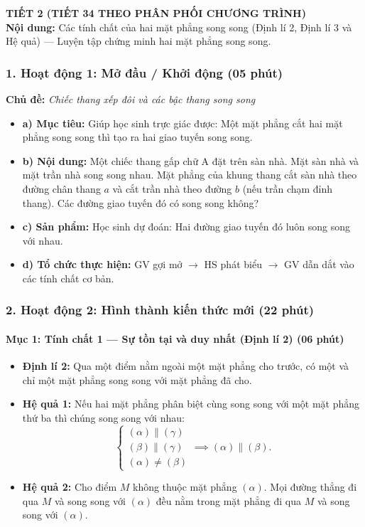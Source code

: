 \documentclass[12pt, a4paper]{article}
\begin{document}
\newpage

{\large \textbf{TIẾT 2 (TIẾT 34 THEO PHÂN PHỐI CHƯƠNG TRÌNH)}}\\[0.3em]
\textbf{Nội dung:} Các tính chất của hai mặt phẳng song song (Định lí 2, Định lí 3 và Hệ quả) --- Luyện tập chứng minh hai mặt phẳng song song.

\subsubsection*{1. Hoạt động 1: Mở đầu / Khởi động (05 phút)}
\textbf{Chủ đề:} \textit{Chiếc thang xếp đôi và các bậc thang song song}
\begin{itemize}
    \item \textbf{a) Mục tiêu:} Giúp học sinh trực giác được: Một mặt phẳng cắt hai mặt phẳng song song thì tạo ra hai giao tuyến song song.
    \item \textbf{b) Nội dung:} Một chiếc thang gấp chữ A đặt trên sàn nhà. Mặt sàn nhà và mặt trần nhà song song nhau. Mặt phẳng của khung thang cắt sàn nhà theo đường chân thang $a$ và cắt trần nhà theo đường $b$ (nếu trần chạm đỉnh thang). Các đường giao tuyến đó có song song không?
    \item \textbf{c) Sản phẩm:} Học sinh dự đoán: Hai đường giao tuyến đó luôn song song với nhau.
    \item \textbf{d) Tổ chức thực hiện:} GV gợi mở $\to$ HS phát biểu $\to$ GV dẫn dắt vào các tính chất cơ bản.
\end{itemize}

\subsubsection*{2. Hoạt động 2: Hình thành kiến thức mới (22 phút)}

\paragraph{Mục 1: Tính chất 1 --- Sự tồn tại và duy nhất (Định lí 2) (06 phút)}
\begin{itemize}
    \item \textbf{Định lí 2:} Qua một điểm nằm ngoài một mặt phẳng cho trước, có một và chỉ một mặt phẳng song song với mặt phẳng đã cho.
    \item \textbf{Hệ quả 1:} Nếu hai mặt phẳng phân biệt cùng song song với một mặt phẳng thứ ba thì chúng song song với nhau:
    $$\begin{cases} (\alpha) \parallel (\gamma) \\ (\beta) \parallel (\gamma) \\ (\alpha) \neq (\beta) \end{cases} \implies (\alpha) \parallel (\beta).$$
    \item \textbf{Hệ quả 2:} Cho điểm $M$ không thuộc mặt phẳng $(\alpha)$. Mọi đường thẳng đi qua $M$ và song song với $(\alpha)$ đều nằm trong mặt phẳng đi qua $M$ và song song với $(\alpha)$.
\end{itemize}
\end{document}
